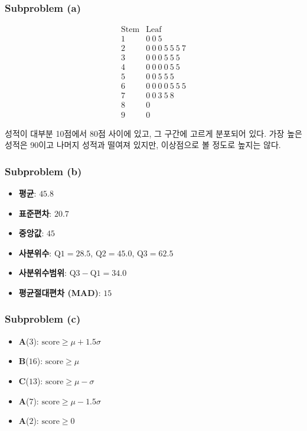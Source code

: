 \documentclass{article}
\begin{document}
\subsubsection*{Subproblem (a)}

\begin{equation*}
\begin{array}{r|l}
	\text{Stem} & \text{Leaf} \\
	\hline
	1 & 0~0~5 \\
	2 & 0~0~0~5~5~5~7 \\
	3 & 0~0~0~5~5~5 \\
	4 & 0~0~0~0~5~5 \\
	5 & 0~0~5~5~5 \\
	6 & 0~0~0~0~5~5~5 \\
	7 & 0~0~3~5~8 \\
	8 & 0 \\
	9 & 0
\end{array}
\end{equation*}

성적이 대부분 10점에서 80점 사이에 있고, 그 구간에 고르게 분포되어 있다.
가장 높은 성적은 90이고 나머지 성적과 떨여져 있지만, 이상점으로 볼 정도로 높지는 않다.

\subsubsection*{Subproblem (b)}

\begin{itemize}
	\item \textbf{평균}: $45.8$
	\item \textbf{표준편차}: $20.7$
	\item \textbf{중앙값}: $45$
	\item \textbf{사분위수}: $\mathrm{Q1} =28.5$, $\mathrm{Q2} = 45.0$, $\mathrm{Q3} = 62.5$
	\item \textbf{사분위수범위}: $\mathrm{Q3} - \mathrm{Q1} = 34.0$
	\item \textbf{평균절대편차 (MAD)}: $15$
\end{itemize}

\subsubsection*{Subproblem (c)}



\begin{itemize}
	\item \textbf{A}($3$): $\mathrm{score} \ge \mu + 1.5 \sigma$
	\item \textbf{B}($16$): $\mathrm{score} \ge \mu$
	\item \textbf{C}($13$): $\mathrm{score} \ge \mu - \sigma$
	\item \textbf{A}($7$): $\mathrm{score} \ge \mu - 1.5 \sigma$
	\item \textbf{A}($2$): $\mathrm{score} \ge 0$
\end{itemize}
\end{document}
